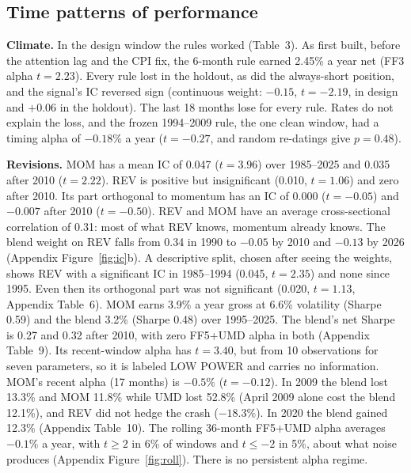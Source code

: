 \documentclass[11pt]{article}
\newcommand{\fit}[1]{\adjustbox{max width=\linewidth}{}}
\begin{document}
\subsection{Time patterns of performance}
\label{sec:time}

\begin{table}[h]
\centering\footnotesize
\caption{Climate strategy, corrected baseline. Each cell: annual net return / FF3 alpha (Newey--West, 6 lags, $t$), in \%. Recent window has 18 observations (low power).}
\label{tab:ctime}
\fit{tables/C2_time_patterns.tex}
\end{table}

\textbf{Climate.} In the design window the rules worked (Table~3). As first built, before the attention lag and the CPI fix, the 6-month rule earned 2.45\% a year net (FF3 alpha $t=2.23$). Every rule lost in the holdout, as did the always-short position, and the signal's IC reversed sign (continuous weight: $-0.15$, $t=-2.19$, in design and $+0.06$ in the holdout). The last 18 months lose for every rule. Rates do not explain the loss, and the frozen 1994--2009 rule, the one clean window, had a timing alpha of $-0.18\%$ a year ($t=-0.27$, and random re-datings give $p=0.48$).

\textbf{Revisions.} MOM has a mean IC of 0.047 ($t=3.96$) over 1985--2025 and 0.035 after 2010 ($t=2.22$). REV is positive but insignificant (0.010, $t=1.06$) and zero after 2010. Its part orthogonal to momentum has an IC of 0.000 ($t=-0.05$) and $-0.007$ after 2010 ($t=-0.50$). REV and MOM have an average cross-sectional correlation of 0.31: most of what REV knows, momentum already knows. The blend weight on REV falls from 0.34 in 1990 to $-0.05$ by 2010 and $-0.13$ by 2026 (Appendix Figure~\ref{fig:ic}b). A descriptive split, chosen after seeing the weights, shows REV with a significant IC in 1985--1994 (0.045, $t=2.35$) and none since 1995. Even then its orthogonal part was not significant (0.020, $t=1.13$, Appendix Table~6). MOM earns 3.9\% a year gross at 6.6\% volatility (Sharpe 0.59) and the blend 3.2\% (Sharpe 0.48) over 1995--2025. The blend's net Sharpe is 0.27 and 0.32 after 2010, with zero FF5+UMD alpha in both (Appendix Table~9). Its recent-window alpha has $t=3.40$, but from 10 observations for seven parameters, so it is labeled LOW POWER and carries no information. MOM's recent alpha (17 months) is $-0.5\%$ ($t=-0.12$). In 2009 the blend lost 13.3\% and MOM 11.8\% while UMD lost 52.8\% (April 2009 alone cost the blend 12.1\%), and REV did not hedge the crash ($-18.3\%$). In 2020 the blend gained 12.3\% (Appendix Table~10). The rolling 36-month FF5+UMD alpha averages $-0.1\%$ a year, with $t\geq 2$ in 6\% of windows and $t\leq-2$ in 5\%, about what noise produces (Appendix Figure~\ref{fig:roll}). There is no persistent alpha regime.
\end{document}
